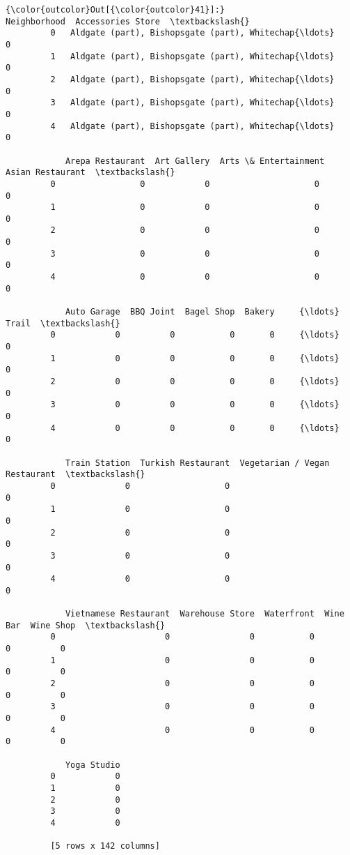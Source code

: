 \documentclass[11pt]{article}
\begin{document}
\begin{Verbatim}[commandchars=\\\{\}]
{\color{outcolor}Out[{\color{outcolor}41}]:}                                         Neighborhood  Accessories Store  \textbackslash{}
         0   Aldgate (part), Bishopsgate (part), Whitechap{\ldots}                  0   
         1   Aldgate (part), Bishopsgate (part), Whitechap{\ldots}                  0   
         2   Aldgate (part), Bishopsgate (part), Whitechap{\ldots}                  0   
         3   Aldgate (part), Bishopsgate (part), Whitechap{\ldots}                  0   
         4   Aldgate (part), Bishopsgate (part), Whitechap{\ldots}                  0   
         
            Arepa Restaurant  Art Gallery  Arts \& Entertainment  Asian Restaurant  \textbackslash{}
         0                 0            0                     0                 0   
         1                 0            0                     0                 0   
         2                 0            0                     0                 0   
         3                 0            0                     0                 0   
         4                 0            0                     0                 0   
         
            Auto Garage  BBQ Joint  Bagel Shop  Bakery     {\ldots}       Trail  \textbackslash{}
         0            0          0           0       0     {\ldots}           0   
         1            0          0           0       0     {\ldots}           0   
         2            0          0           0       0     {\ldots}           0   
         3            0          0           0       0     {\ldots}           0   
         4            0          0           0       0     {\ldots}           0   
         
            Train Station  Turkish Restaurant  Vegetarian / Vegan Restaurant  \textbackslash{}
         0              0                   0                              0   
         1              0                   0                              0   
         2              0                   0                              0   
         3              0                   0                              0   
         4              0                   0                              0   
         
            Vietnamese Restaurant  Warehouse Store  Waterfront  Wine Bar  Wine Shop  \textbackslash{}
         0                      0                0           0         0          0   
         1                      0                0           0         0          0   
         2                      0                0           0         0          0   
         3                      0                0           0         0          0   
         4                      0                0           0         0          0   
         
            Yoga Studio  
         0            0  
         1            0  
         2            0  
         3            0  
         4            0  
         
         [5 rows x 142 columns]
\end{Verbatim}
            
\end{document}
